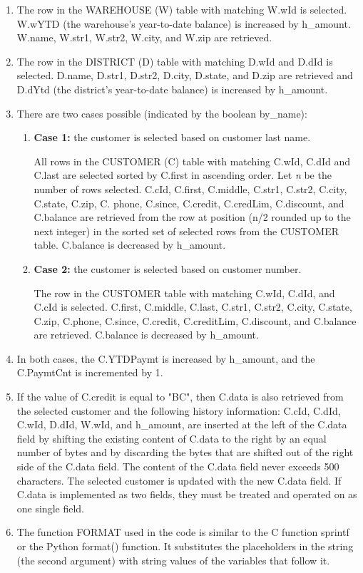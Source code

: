 \begin{enumerate}
    \item The row in the WAREHOUSE (W) table with matching W.wId is selected. W.wYTD (the warehouse's year-to-date balance) is increased by h\_amount. W.name, W.str1, W.str2, W.city, and W.zip are retrieved.
    
    \item The row in the DISTRICT (D) table with matching D.wId and D.dId is selected. D.name, D.str1, D.str2, D.city, D.state, and D.zip are retrieved and D.dYtd (the district's year-to-date balance) is increased by h\_amount.
    
    \item There are two cases possible (indicated by the boolean by\_name):
    
    \begin{enumerate}
        \item \textbf{Case 1:} the customer is selected based on customer last name.
        
        All rows in the CUSTOMER (C) table with matching C.wId, C.dId and C.last are selected sorted by C.first in ascending order. Let \textit{n} be the number of rows selected. C.cId, C.first, C.middle, C.str1, C.str2, C.city, C.state, C.zip, C. phone, C.since, C.credit, C.credLim, C.discount, and C.balance are retrieved from the row at position (n/2 rounded up to the next integer) in the sorted set of selected rows from the CUSTOMER table. C.balance is decreased by h\_amount.
        
        \item \textbf{Case 2:} the customer is selected based on customer number.
        
        The row in the CUSTOMER table with matching C.wId, C.dId, and C.cId is selected. C.first, C.middle, C.last, C.str1, C.str2, C.city, C.state, C.zip, C.phone, C.since, C.credit, C.creditLim, C.discount, and C.balance are retrieved. C.balance is decreased by h\_amount.
    \end{enumerate}
    
    \item In both cases, the C.YTDPaymt is increased by h\_amount, and the C.PaymtCnt is incremented by 1.
    
    \item If the value of C.credit is equal to "BC", then C.data is also retrieved from the selected customer and the following history information: C.cId, C.dId, C.wId, D.dId, W.wId, and h\_amount, are inserted at the left of the C.data field by shifting the existing content of C.data to the right by an equal number of bytes and by discarding the bytes that are shifted out of the right side of the C.data field. The content of the C.data field never exceeds 500 characters. The selected customer is updated with the new C.data field. If C.data is implemented as two fields, they must be treated and operated on as one single field.
    
    \item The function FORMAT used in the code is similar to the C function sprintf or the Python format() function. It substitutes the placeholders in the string (the second argument) with string values of the variables that follow it.
\end{enumerate}
